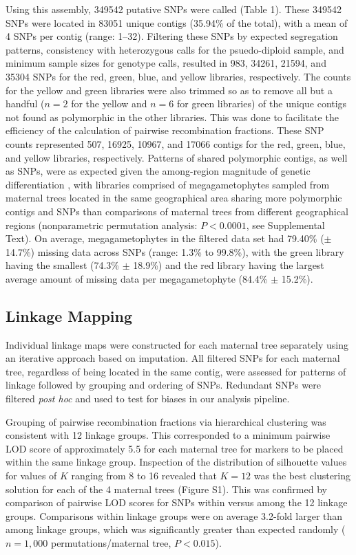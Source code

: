 \documentclass[smallextended]{svjour3}
\begin{document}
Using this assembly, \num{349542} putative SNPs were called (Table 1). These
\num{349542} SNPs were located in \num{83051} unique contigs (35.94\% of the
total), with a mean of \num{4} SNPs per contig (range:
\SIrange{1}{32}{}). Filtering these SNPs by expected segregation patterns,
consistency with heterozygous calls for the psuedo-diploid sample, and minimum
sample sizes for genotype calls, resulted in \num{983}, \num{34261},
\num{21594}, and \num{35304} SNPs for the red, green, blue, and yellow
libraries, respectively. The counts for the yellow and green libraries were also
trimmed so as to remove all but a handful ($n = 2$ for the yellow and $n = 6$
for green libraries) of the unique contigs not found as polymorphic in the other
libraries. This was done to facilitate the efficiency of the calculation of
pairwise recombination fractions. These SNP counts represented \num{507},
\num{16925}, \num{10967}, and \num{17066} contigs for the red, green, blue, and
yellow libraries, respectively. Patterns of shared polymorphic contigs, as well
as SNPs, were as expected given the among-region magnitude of genetic
differentiation \citep[Figure 2, see][]{Eckert:2008}, with libraries comprised
of megagametophytes sampled from maternal trees located in the same geographical
area sharing more polymorphic contigs and SNPs than comparisons of maternal
trees from different geographical regions (nonparametric permutation analysis:
$P < 0.0001$, see Supplemental Text).  On average, megagametophytes in the
filtered data set had 79.40\% ($\pm$ 14.7\%) missing data across SNPs (range:
1.3\% to 99.8\%), with the green library having the smallest (74.3\% $\pm$
18.9\%) and the red library having the largest average amount of missing data
per megagametophyte (84.4\% $\pm$ 15.2\%).

\subsection*{Linkage Mapping}

Individual linkage maps were constructed for each maternal tree separately using
an iterative approach based on imputation. All filtered SNPs for each maternal
tree, regardless of being located in the same contig, were assessed for patterns
of linkage followed by grouping and ordering of SNPs. Redundant SNPs were
filtered \textit{post hoc} and used to test for biases in our analysis pipeline.

Grouping of pairwise recombination fractions via hierarchical clustering was
consistent with \num{12} linkage groups.  This corresponded to a minimum
pairwise LOD score of approximately 5.5 for each maternal tree for markers to be
placed within the same linkage group.  Inspection of the distribution of
silhouette values for values of $K$ ranging from \num{8} to \num{16} revealed
that $K = 12$ was the best clustering solution for each of the \num{4} maternal
trees (Figure S1). This was confirmed by comparison of pairwise LOD scores for
SNPs within versus among the \num{12} linkage groups. Comparisons within linkage
groups were on average 3.2-fold larger than among linkage groups, which was
significantly greater than expected randomly ($n = 1,000$ permutations/maternal
tree, $P < 0.015$).
\end{document}
